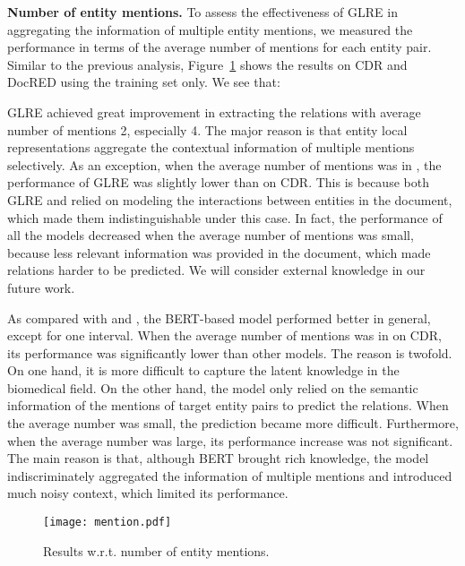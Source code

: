 \documentclass[11pt,a4paper]{article}
\begin{document}
\smallskip
\noindent\textbf{Number of entity mentions.} To assess the effectiveness of GLRE in aggregating the information of multiple entity mentions, we measured the performance in terms of the average number of mentions for each entity pair. Similar to the previous analysis, Figure~\ref{fig:mention} shows the results on CDR and DocRED using the training set only. We see that:
\begin{compactenum}[(1)]
\item GLRE achieved great improvement in extracting the relations with average number of mentions  2, especially  4. The major reason is that  entity local representations aggregate the contextual information of multiple mentions selectively. As an exception, when the average number of mentions was in , the performance of GLRE was slightly lower than \citet{christopoulou2019connecting} on CDR. This is because both GLRE and \citet{christopoulou2019connecting} relied on modeling the interactions between entities in the document, which made them indistinguishable under this case. In fact, the performance of all the models decreased when the average number of mentions was small, because less relevant information was provided in the document, which made relations harder to be predicted. We will consider external knowledge in our future work.

\item As compared with \citet{zhang2018graph} and \citet{christopoulou2019connecting}, the BERT-based model \cite{wang2019fine} performed better in general, except for one interval. When the average number of mentions was in  on CDR, its performance was significantly lower than other models. The reason is twofold. On one hand, it is more difficult to capture the latent knowledge in the biomedical field. On the other hand, the model \cite{wang2019fine} only relied on the semantic information of the mentions of target entity pairs to predict the relations. When the average number was small, the prediction became more difficult. Furthermore, when the average number was large, its performance increase was not significant. The main reason is that, although BERT brought rich knowledge, the model \cite{wang2019fine} indiscriminately aggregated the information of multiple mentions and introduced much noisy context, which limited its performance. 
\end{compactenum}

\begin{figure}
	\centering
	\texttt{[image: mention.pdf]}
	\caption{Results w.r.t. number of entity mentions.}
	\label{fig:mention}
\end{figure}
\end{document}

